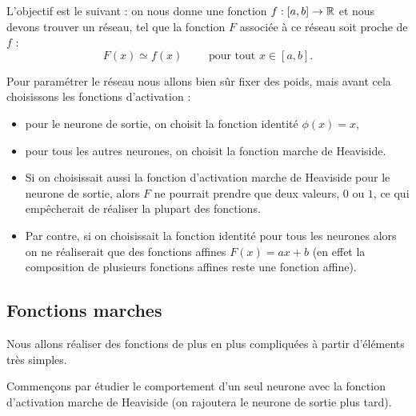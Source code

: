 L'objectif est le suivant : on nous donne une fonction $f : [a,b] \to \mathbb{R}$ et nous devons trouver un réseau, tel que la fonction $F$ associée à ce réseau soit proche de $f$ :
$$F(x) \simeq f(x) \qquad \text{ pour tout } x \in [a,b].$$

Pour paramétrer le réseau nous allons bien sûr fixer des poids, mais avant cela choisissons les fonctions d'activation :
\begin{itemize}
	\item pour le neurone de sortie, on choisit la fonction identité $\phi(x)=x$,
	\item pour tous les autres neurones, on choisit la fonction marche de Heaviside.
\end{itemize}


	\begin{itemize}
		\item Si on choisissait aussi la fonction d'activation marche de Heaviside pour le neurone de sortie, alors $F$ ne pourrait prendre que deux valeurs, $0$ ou $1$, ce qui empêcherait de réaliser la plupart des fonctions.
		
		\item Par contre, si on choisissait la fonction identité pour tous les neurones alors on ne réaliserait que des fonctions affines $F(x)=ax+b$ (en effet la composition de plusieurs fonctions affines reste une fonction affine). 
		
	\end{itemize}

\subsection{Fonctions marches}
\label{ssec:marches}

Nous allons réaliser des fonctions de plus en plus compliquées à partir d'éléments très simples.


Commençons par étudier le comportement d'un seul neurone avec la fonction d'activation marche de Heaviside (on rajoutera le neurone de sortie plus tard).

